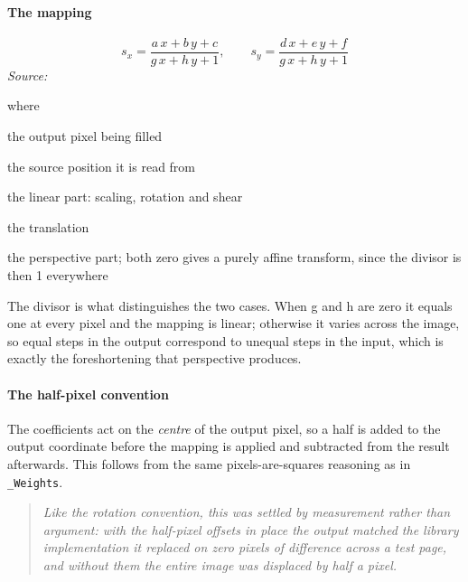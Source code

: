 \paragraph{The mapping}

\begin{equation}
s_x = \frac{a\,x + b\,y + c}{g\,x + h\,y + 1}, \qquad s_y = \frac{d\,x + e\,y + f}{g\,x + h\,y + 1}
\end{equation}
\noindent\emph{Source: }\cite{wolberg1990}


\noindent where
\begin{description}[leftmargin=2.4em,style=nextline,font=\normalfont\ttfamily]\setlength\itemsep{1pt}
  \item[{$x,\, y$}] \normalfont the output pixel being filled
  \item[{$s_x,\, s_y$}] \normalfont the source position it is read from
  \item[{$a,\, b,\, d,\, e$}] \normalfont the linear part: scaling, rotation and shear
  \item[{$c,\, f$}] \normalfont the translation
  \item[{$g,\, h$}] \normalfont the perspective part; both zero gives a purely affine transform, since the divisor is then 1 everywhere
\end{description}
The divisor is what distinguishes the two cases. When g and h are zero it equals one at every pixel and the mapping is linear; otherwise it varies across the image, so equal steps in the output correspond to unequal steps in the input, which is exactly the foreshortening that perspective produces.


\paragraph{The half-pixel convention}
The coefficients act on the \emph{centre} of the output pixel, so a half is added to the output coordinate before the mapping is applied and subtracted from the result afterwards. This follows from the same pixels-are-squares reasoning as in \texttt{\_Weights}.


\begin{quote}\small\itshape Like the rotation convention, this was settled by measurement rather than argument: with the half-pixel offsets in place the output matched the library implementation it replaced on zero pixels of difference across a test page, and without them the entire image was displaced by half a pixel.\end{quote}

